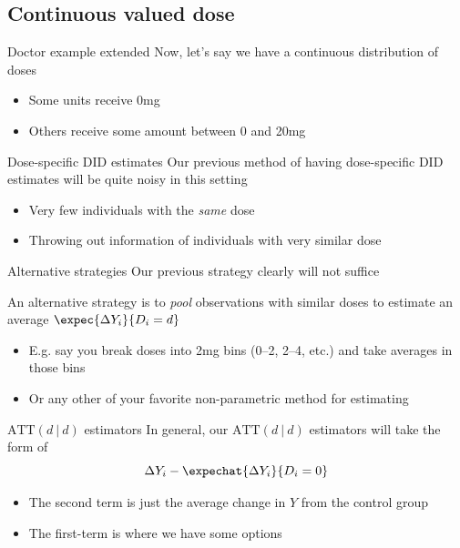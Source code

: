 \documentclass[aspectratio=169,t]{beamer}
\begin{document}
\subsection{Continuous valued dose}

\begin{frame}{Doctor example extended}
  Now, let's say we have a continuous distribution of doses
  \begin{itemize}
    \item Some units receive 0mg
    \item Others receive some amount between 0 and 20mg
  \end{itemize}
\end{frame}


\begin{frame}{Dose-specific DID estimates}
  Our previous method of having dose-specific DID estimates will be quite noisy in this setting
  \begin{itemize}
    \item Very few individuals with the \emph{same} dose

    \item Throwing out information of individuals with very similar dose
  \end{itemize}
\end{frame}


\begin{frame}{Alternative strategies}
  Our previous strategy clearly will not suffice

  \bigskip
  An alternative strategy is to \emph{pool} observations with similar doses to estimate an average $\expec{\Delta Y_i}{D_i = d}$
  \begin{itemize}
    \item E.g. say you break doses into 2mg bins (0--2, 2--4, etc.) and take averages in those bins

    \item Or any other of your favorite non-parametric method for estimating
  \end{itemize}
\end{frame}

\begin{frame}{$\text{ATT}(d \ | \ d)$ estimators}
  In general, our $\text{ATT}(d \ | \ d)$ estimators will take the form of
  $$
    \Delta Y_i - \expechat{\Delta Y_i}{D_i = 0}
  $$

  \begin{itemize}
    \item The second term is just the average change in $Y$ from the control group

    \item The first-term is where we have some options
  \end{itemize}
\end{frame}
\end{document}
